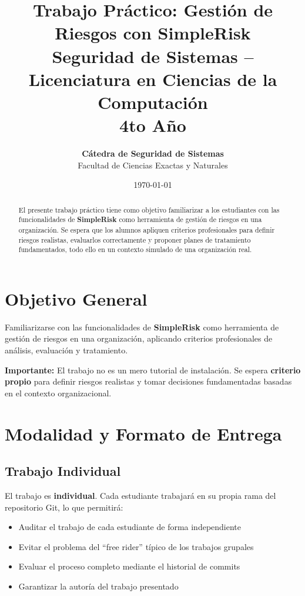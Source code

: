 \documentclass[11pt,a4paper]{article}
\title{
    \textbf{\Large Trabajo Práctico: Gestión de Riesgos con SimpleRisk}\\[0.5cm]
    \normalsize Seguridad de Sistemas -- Licenciatura en Ciencias de la Computación\\[0.2cm]
    \normalsize 4to Año
}
\author{
    \textbf{Cátedra de Seguridad de Sistemas}\\
    Facultad de Ciencias Exactas y Naturales
}
\date{\today}
\begin{document}
\maketitle
\thispagestyle{empty}

\begin{abstract}
\noindent El presente trabajo práctico tiene como objetivo familiarizar a los estudiantes con las funcionalidades de \textbf{SimpleRisk} como herramienta de gestión de riesgos en una organización. Se espera que los alumnos apliquen criterios profesionales para definir riesgos realistas, evaluarlos correctamente y proponer planes de tratamiento fundamentados, todo ello en un contexto simulado de una organización real.
\end{abstract}

\tableofcontents
\newpage

\section{Objetivo General}

Familiarizarse con las funcionalidades de \textbf{SimpleRisk} como herramienta de gestión de riesgos en una organización, aplicando criterios profesionales de análisis, evaluación y tratamiento. 

\textbf{Importante:} El trabajo no es un mero tutorial de instalación. Se espera \textbf{criterio propio} para definir riesgos realistas y tomar decisiones fundamentadas basadas en el contexto organizacional.

\section{Modalidad y Formato de Entrega}

\subsection{Trabajo Individual}

El trabajo es \textbf{individual}. Cada estudiante trabajará en su propia rama del repositorio Git, lo que permitirá:
\begin{itemize}
    \item Auditar el trabajo de cada estudiante de forma independiente
    \item Evitar el problema del ``free rider'' típico de los trabajos grupales
    \item Evaluar el proceso completo mediante el historial de commits
    \item Garantizar la autoría del trabajo presentado
\end{itemize}
\end{document}
